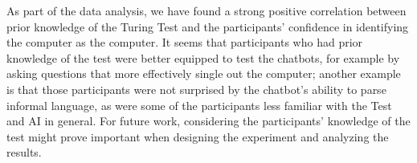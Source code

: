 \begin{figure}[ht]
   \begin{center}
   \end{center}
   \caption{}
   \label{convex3}
\end{figure}

As part of the data analysis, we have found a strong positive correlation between prior knowledge of the Turing Test and the participants' confidence in identifying the computer as the computer. It seems that participants who had prior knowledge of the test were better equipped to test the chatbots, for example by asking questions that more effectively single out the computer; another example is that those participants were not surprised by the chatbot's ability to parse informal language, as were some of the participants less familiar with the Test and AI in general. For future work, considering the participants' knowledge of the test might prove important when designing the experiment and analyzing the results.

